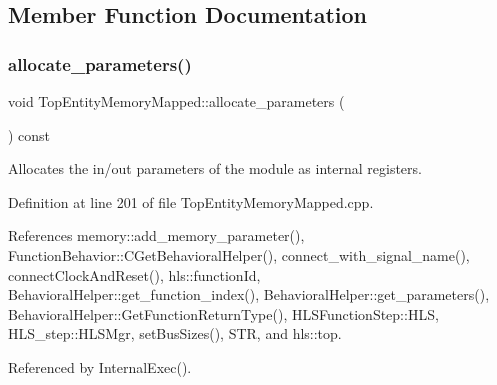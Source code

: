 \subsection{Member Function Documentation}
\mbox{\label{classTopEntityMemoryMapped_a2fb8c5cf2248bf65c531ab60929d4b97}} 
\subsubsection{\texorpdfstring{allocate\+\_\+parameters()}{allocate\_parameters()}}
{\footnotesize\ttfamily void Top\+Entity\+Memory\+Mapped\+::allocate\+\_\+parameters (\begin{DoxyParamCaption}{ }\end{DoxyParamCaption}) const\hspace{0.3cm}{\ttfamily [private]}}



Allocates the in/out parameters of the module as internal registers. 



Definition at line 201 of file Top\+Entity\+Memory\+Mapped.\+cpp.



References memory\+::add\+\_\+memory\+\_\+parameter(), Function\+Behavior\+::\+C\+Get\+Behavioral\+Helper(), connect\+\_\+with\+\_\+signal\+\_\+name(), connect\+Clock\+And\+Reset(), hls\+::function\+Id, Behavioral\+Helper\+::get\+\_\+function\+\_\+index(), Behavioral\+Helper\+::get\+\_\+parameters(), Behavioral\+Helper\+::\+Get\+Function\+Return\+Type(), H\+L\+S\+Function\+Step\+::\+H\+LS, H\+L\+S\+\_\+step\+::\+H\+L\+S\+Mgr, set\+Bus\+Sizes(), S\+TR, and hls\+::top.



Referenced by Internal\+Exec().

